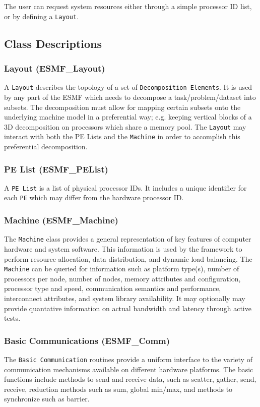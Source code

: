 The user can request system resources either through a simple processor
ID list, or by defining a {\tt Layout}.

\subsection{Class Descriptions}

\subsubsection{Layout (ESMF\_Layout)}
\label{sec:layout} 
A {\tt Layout} describes the topology of a set of {\tt Decomposition 
Elements}.
It is used by any part of the ESMF which needs
to decompose a task/problem/dataset into subsets.
The decomposition must allow for mapping certain subsets onto the
underlying machine model in a preferential way; e.g. keeping
vertical blocks of a 3D decomposition on processors which share
a memory pool.
The {\tt Layout} may interact with both the PE Lists
and the {\tt Machine} in order to accomplish this preferential
decomposition.

\subsubsection{PE List (ESMF\_PEList)}
\label{sec:pelist} 
A {\tt PE List} is a list of physical processor IDs.  It includes a 
unique identifier for each {\tt PE} which may differ from the hardware 
processor ID.  

\subsubsection{Machine (ESMF\_Machine)} 
\label{sec:machine} 
The {\tt Machine} class provides a general representation of 
key features of computer hardware and system software.  
This information is used by the framework to 
perform resource allocation, data distribution, and dynamic load balancing.  
The {\tt Machine} can be queried for information such as
platform type(s), number of processors per node, number of nodes, 
memory attributes and configuration, processor type and speed,
communication semantics and performance, 
interconnect attributes, and system library availability.
It may optionally may provide quantative information 
on actual bandwidth and latency through active tests.  

\subsubsection{Basic Communications (ESMF\_Comm)}
\label{sec:basiccomm} 
The {\tt Basic Communication} routines provide a uniform 
interface to the variety of communication mechanisms available
on different hardware platforms.  
The basic functions include methods to send
and receive data, such as scatter, gather, send, receive,
reduction methods such as sum, global min/max, and methods
to synchronize such as barrier. 


